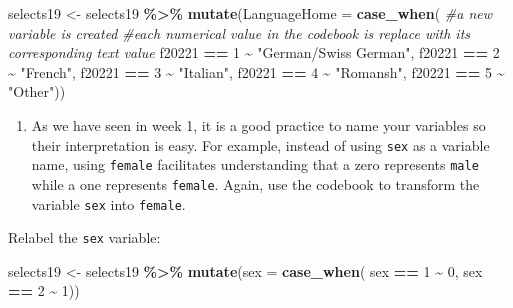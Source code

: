 \documentclass[
]{book}
\newenvironment{Shaded}{\begin{snugshade}}{\end{snugshade}}
\newcommand{\AttributeTok}[1]{\textcolor[rgb]{0.13,0.29,0.53}{#1}}
\newcommand{\CommentTok}[1]{\textcolor[rgb]{0.56,0.35,0.01}{\textit{#1}}}
\newcommand{\DecValTok}[1]{\textcolor[rgb]{0.00,0.00,0.81}{#1}}
\newcommand{\FunctionTok}[1]{\textcolor[rgb]{0.13,0.29,0.53}{\textbf{#1}}}
\newcommand{\NormalTok}[1]{#1}
\newcommand{\OtherTok}[1]{\textcolor[rgb]{0.56,0.35,0.01}{#1}}
\newcommand{\SpecialCharTok}[1]{\textcolor[rgb]{0.81,0.36,0.00}{\textbf{#1}}}
\newcommand{\StringTok}[1]{\textcolor[rgb]{0.31,0.60,0.02}{#1}}
\providecommand{\tightlist}{%
  \setlength{\itemsep}{0pt}\setlength{\parskip}{0pt}}
\begin{document}
\begin{Shaded}
\begin{Highlighting}[]
\NormalTok{selects19 }\OtherTok{\textless{}{-}}\NormalTok{ selects19 }\SpecialCharTok{\%\textgreater{}\%}
  \FunctionTok{mutate}\NormalTok{(}\AttributeTok{LanguageHome =} \FunctionTok{case\_when}\NormalTok{( }\CommentTok{\#a new variable is created}
\CommentTok{\#each numerical value in the codebook is replace with it\textquotesingle{}s corresponding text value}
\NormalTok{    f20221 }\SpecialCharTok{==} \DecValTok{1} \SpecialCharTok{\textasciitilde{}} \StringTok{"German/Swiss German"}\NormalTok{, }
\NormalTok{    f20221 }\SpecialCharTok{==} \DecValTok{2} \SpecialCharTok{\textasciitilde{}} \StringTok{"French"}\NormalTok{,}
\NormalTok{    f20221 }\SpecialCharTok{==} \DecValTok{3} \SpecialCharTok{\textasciitilde{}} \StringTok{"Italian"}\NormalTok{,}
\NormalTok{    f20221 }\SpecialCharTok{==} \DecValTok{4} \SpecialCharTok{\textasciitilde{}} \StringTok{"Romansh"}\NormalTok{,}
\NormalTok{    f20221 }\SpecialCharTok{==} \DecValTok{5} \SpecialCharTok{\textasciitilde{}} \StringTok{"Other"}\NormalTok{))}
\end{Highlighting}
\end{Shaded}

\begin{enumerate}
\def\labelenumi{\arabic{enumi}.}
\setcounter{enumi}{2}
\tightlist
\item
  As we have seen in week 1, it is a good practice to name your variables so their interpretation is easy. For example, instead of using \texttt{sex} as a variable name, using \texttt{female} facilitates understanding that a zero represents \texttt{male} while a one represents \texttt{female}. Again, use the codebook to transform the variable \texttt{sex} into \texttt{female}.
\end{enumerate}

Relabel the \texttt{sex} variable:

\begin{Shaded}
\begin{Highlighting}[]
\NormalTok{selects19 }\OtherTok{\textless{}{-}}\NormalTok{ selects19 }\SpecialCharTok{\%\textgreater{}\%}
  \FunctionTok{mutate}\NormalTok{(}\AttributeTok{sex =} \FunctionTok{case\_when}\NormalTok{(}
\NormalTok{    sex }\SpecialCharTok{==} \DecValTok{1} \SpecialCharTok{\textasciitilde{}} \DecValTok{0}\NormalTok{,}
\NormalTok{    sex }\SpecialCharTok{==} \DecValTok{2} \SpecialCharTok{\textasciitilde{}} \DecValTok{1}\NormalTok{))}
\end{Highlighting}
\end{Shaded}
\end{document}
